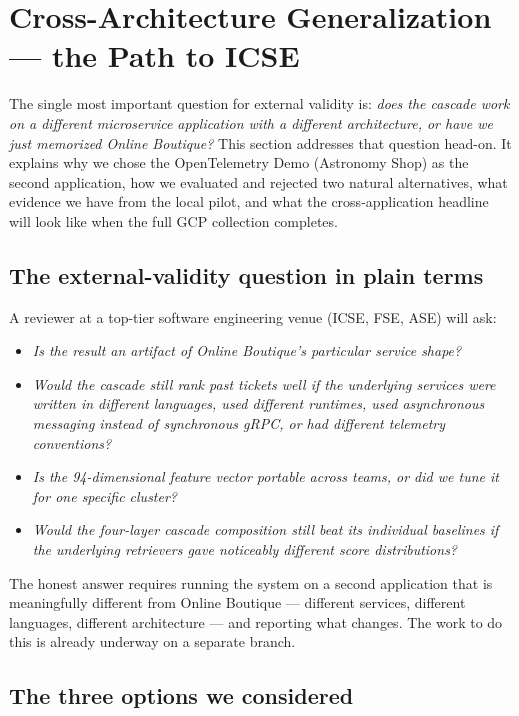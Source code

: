 \section{Cross-Architecture Generalization --- the Path to ICSE}
\label{sec:cross-app}

The single most important question for external validity is: \emph{does the cascade work on a different microservice application with a different architecture, or have we just memorized Online Boutique?} This section addresses that question head-on. It explains why we chose the OpenTelemetry Demo (Astronomy Shop) as the second application, how we evaluated and rejected two natural alternatives, what evidence we have from the local pilot, and what the cross-application headline will look like when the full GCP collection completes.

\subsection{The external-validity question in plain terms}

A reviewer at a top-tier software engineering venue (ICSE, FSE, ASE) will ask:

\begin{itemize}
\item \emph{Is the result an artifact of Online Boutique's particular service shape?}
\item \emph{Would the cascade still rank past tickets well if the underlying services were written in different languages, used different runtimes, used asynchronous messaging instead of synchronous gRPC, or had different telemetry conventions?}
\item \emph{Is the 94-dimensional feature vector portable across teams, or did we tune it for one specific cluster?}
\item \emph{Would the four-layer cascade composition still beat its individual baselines if the underlying retrievers gave noticeably different score distributions?}
\end{itemize}

The honest answer requires running the system on a second application that is meaningfully different from Online Boutique --- different services, different languages, different architecture --- and reporting what changes. The work to do this is already underway on a separate branch.

\subsection{The three options we considered}

